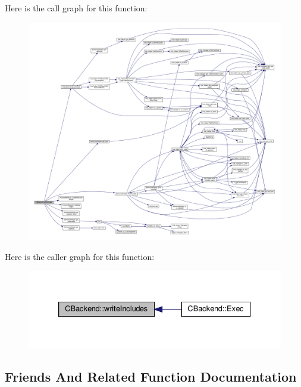 Here is the call graph for this function\+:
\nopagebreak
\begin{figure}[H]
\begin{center}
\leavevmode
\includegraphics[width=350pt]{d3/de2/classCBackend_a4d3545310fee36bb8cfad7a893a8eb31_cgraph}
\end{center}
\end{figure}
Here is the caller graph for this function\+:
\nopagebreak
\begin{figure}[H]
\begin{center}
\leavevmode
\includegraphics[width=333pt]{d3/de2/classCBackend_a4d3545310fee36bb8cfad7a893a8eb31_icgraph}
\end{center}
\end{figure}


\subsection{Friends And Related Function Documentation}
\mbox{\label{classCBackend_a42d2c18c6162a3c1113cb8c3fec36a4f}} 
